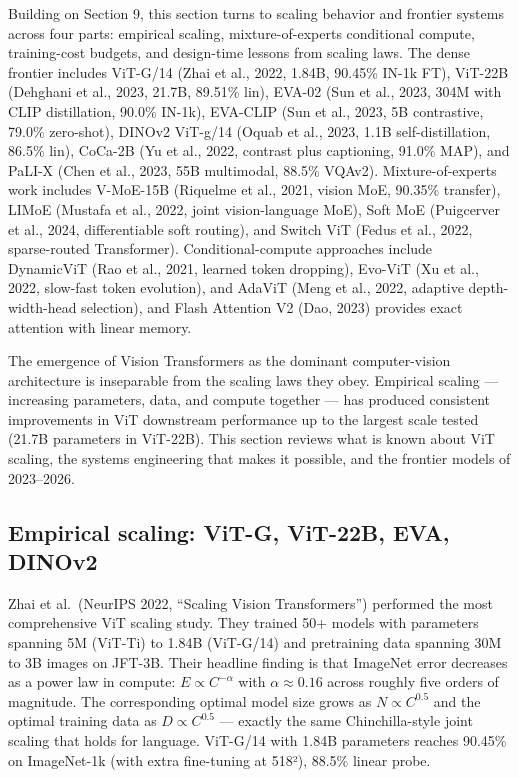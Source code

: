 \documentclass{article}
\begin{document}
Building on Section 9, this section turns to scaling behavior and frontier systems across four parts: empirical scaling, mixture-of-experts conditional compute, training-cost budgets, and design-time lessons from scaling laws. The dense frontier includes ViT-G/14 (Zhai et al., 2022, 1.84B, 90.45\% IN-1k FT), ViT-22B (Dehghani et al., 2023, 21.7B, 89.51\% lin), EVA-02 (Sun et al., 2023, 304M with CLIP distillation, 90.0\% IN-1k), EVA-CLIP (Sun et al., 2023, 5B contrastive, 79.0\% zero-shot), DINOv2 ViT-g/14 (Oquab et al., 2023, 1.1B self-distillation, 86.5\% lin), CoCa-2B (Yu et al., 2022, contrast plus captioning, 91.0\% MAP), and PaLI-X (Chen et al., 2023, 55B multimodal, 88.5\% VQAv2). Mixture-of-experts work includes V-MoE-15B (Riquelme et al., 2021, vision MoE, 90.35\% transfer), LIMoE (Mustafa et al., 2022, joint vision-language MoE), Soft MoE (Puigcerver et al., 2024, differentiable soft routing), and Switch ViT (Fedus et al., 2022, sparse-routed Transformer). Conditional-compute approaches include DynamicViT (Rao et al., 2021, learned token dropping), Evo-ViT (Xu et al., 2022, slow-fast token evolution), and AdaViT (Meng et al., 2022, adaptive depth-width-head selection), and Flash Attention V2 (Dao, 2023) provides exact attention with linear memory.

The emergence of Vision Transformers as the dominant computer-vision architecture is inseparable from the scaling laws they obey. Empirical scaling --- increasing parameters, data, and compute together --- has produced consistent improvements in ViT downstream performance up to the largest scale tested (21.7B parameters in ViT-22B). This section reviews what is known about ViT scaling, the systems engineering that makes it possible, and the frontier models of 2023--2026.

\subsection{Empirical scaling: ViT-G, ViT-22B, EVA, DINOv2}\label{empirical-scaling-vit-g-vit-22b-eva-dinov2}

Zhai et al.~(NeurIPS 2022, ``Scaling Vision Transformers'') performed the most comprehensive ViT scaling study. They trained 50+ models with parameters spanning 5M (ViT-Ti) to 1.84B (ViT-G/14) and pretraining data spanning 30M to 3B images on JFT-3B. Their headline finding is that ImageNet error decreases as a power law in compute: \(E \propto C^{-\alpha}\) with \(\alpha \approx 0.16\) across roughly five orders of magnitude. The corresponding optimal model size grows as \(N \propto C^{0.5}\) and the optimal training data as \(D \propto C^{0.5}\) --- exactly the same Chinchilla-style joint scaling that holds for language. ViT-G/14 with 1.84B parameters reaches 90.45\% on ImageNet-1k (with extra fine-tuning at 518²), 88.5\% linear probe.
\end{document}
